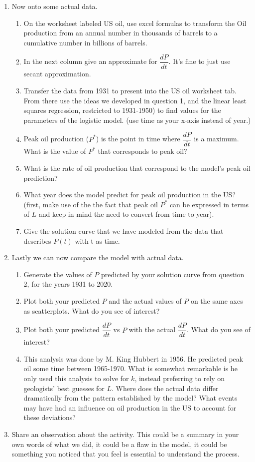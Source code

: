 \documentclass{amsbook}
\begin{document}
\begin{enumerate}
	\item Now onto some actual data. 
	\begin{enumerate}
	\item On the worksheet labeled US oil, use excel formulas to transform the Oil production from an annual number in thousands of barrels to a cumulative number in billions of barrels.
	\item In the next column give an approximate for $\dfrac{dP}{dt}$. It's fine to just use secant approximation.
	\item Transfer the data from 1931 to present into the US oil worksheet tab. From there use the ideas we developed in question 1, and the linear least squares regression, restricted to 1931-1950) to find values for the parameters of the logistic model. (use time as your x-axis instead of year.)
	\item Peak oil production ($P^*$) is the point in time where $\dfrac{dP}{dt}$ is a maximum. What is the value of $P^*$ that corresponds to peak oil?
	\item What is the rate of oil production that correspond to the model's peak oil prediction?
	\item What year does the model predict for peak oil production in the US? (first, make use of the the fact that peak oil $P^*$ can be expressed in terms of $L$ and keep in mind the need to convert from time to year).
	\item Give the solution curve that we have modeled from the data that describes $P(t)$ with t as time.
	\end{enumerate}	
\item Lastly we can now compare the model with actual data.
	\begin{enumerate}
		\item Generate the values of $P$ predicted by your solution curve from question 2, for the years 1931 to 2020.
		\item Plot both your predicted $P$ and the actual values of $P$ on the same axes as scatterplots. What do you see of interest? 
		\item Plot both your predicted $\dfrac{dP}{dt}$ vs $P$ with the actual $\dfrac{dP}{dt}$. What do you see of interest?
		\item This analysis was done by M. King Hubbert in 1956. He predicted peak oil some time between 1965-1970. What is somewhat remarkable is he only used this analysis to solve for $k$, instead preferring to rely on geologists' best guesses for $L$. Where does the actual data differ dramatically from the pattern established by the model? What events may have had an influence on oil production in the US to account for these deviations?
\end{enumerate}	
\item Share an observation about the activity. This could be a summary in your own words of what we did, it could be a flaw in the model, it could be something you noticed that you feel is essential to understand the process.	 
\end{enumerate}
\newpage	    
\end{document}
